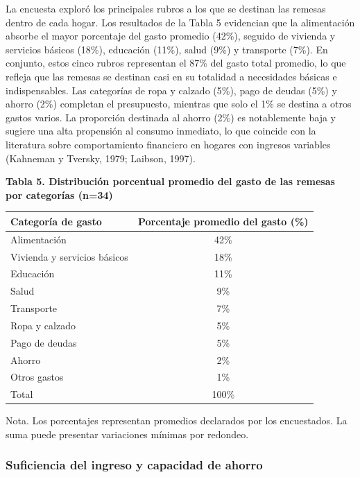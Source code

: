 \documentclass[12pt,letterpaper]{article}
\begin{document}
La encuesta exploró los principales rubros a los que se destinan las remesas dentro de cada hogar. Los resultados de la Tabla 5 evidencian que la alimentación absorbe el mayor porcentaje del gasto promedio (42\%), seguido de vivienda y servicios básicos (18\%), educación (11\%), salud (9\%) y transporte (7\%). En conjunto, estos cinco rubros representan el 87\% del gasto total promedio, lo que refleja que las remesas se destinan casi en su totalidad a necesidades básicas e indispensables. Las categorías de ropa y calzado (5\%), pago de deudas (5\%) y ahorro (2\%) completan el presupuesto, mientras que solo el 1\% se destina a otros gastos varios. La proporción destinada al ahorro (2\%) es notablemente baja y sugiere una alta propensión al consumo inmediato, lo que coincide con la literatura sobre comportamiento financiero en hogares con ingresos variables (Kahneman y Tversky, 1979; Laibson, 1997).

\textbf{Tabla 5. Distribución porcentual promedio del gasto de las remesas por categorías (n=34)}

\begin{longtable}[]{@{}lc@{}}
\toprule\noalign{}
Categoría de gasto & Porcentaje promedio del gasto (\%) \\
\midrule\noalign{}
\endhead
\bottomrule\noalign{}
\endlastfoot
Alimentación & 42\% \\
Vivienda y servicios básicos & 18\% \\
Educación & 11\% \\
Salud & 9\% \\
Transporte & 7\% \\
Ropa y calzado & 5\% \\
Pago de deudas & 5\% \\
Ahorro & 2\% \\
Otros gastos & 1\% \\
Total & 100\% \\
\end{longtable}

Nota. Los porcentajes representan promedios declarados por los encuestados. La suma puede presentar variaciones mínimas por redondeo.

\subsubsection{\texorpdfstring{\textbf{Suficiencia del ingreso y capacidad de ahorro}}{Suficiencia del ingreso y capacidad de ahorro}}\label{suficiencia-del-ingreso-y-capacidad-de-ahorro}
\end{document}
